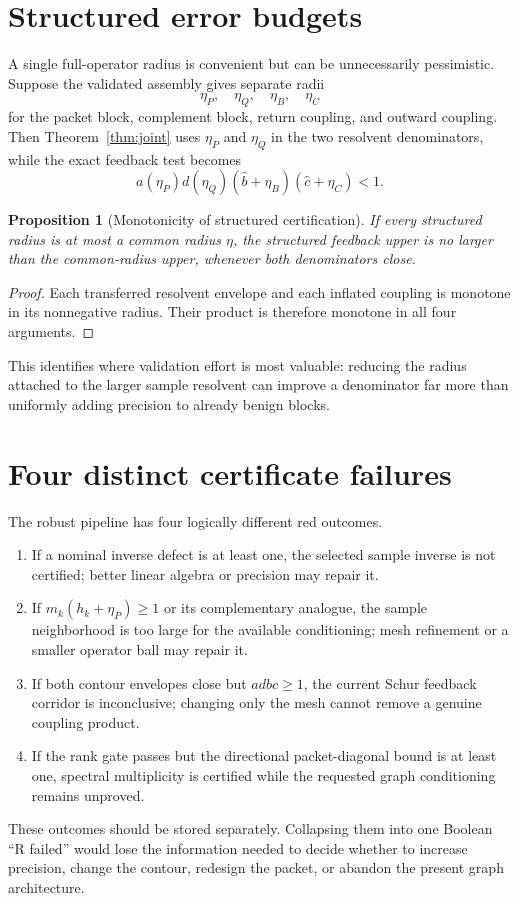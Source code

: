 \documentclass[12pt]{article}
\newtheorem{proposition}[theorem]{Proposition}
\begin{document}
\section{Structured error budgets}
A single full-operator radius is convenient but can be unnecessarily
pessimistic.  Suppose the validated assembly gives separate radii
\[
 \eta_P,\quad\eta_Q,\quad\eta_B,\quad\eta_C
\]
for the packet block, complement block, return coupling, and outward
coupling.  Then Theorem~\ref{thm:joint} uses $\eta_P$ and $\eta_Q$ in the two
resolvent denominators, while the exact feedback test becomes
\[
 a(\eta_P)d(\eta_Q)
 (\widehat b+\eta_B)(\widehat c+\eta_C)<1.
\]

\begin{proposition}[Monotonicity of structured certification]
If every structured radius is at most a common radius $\eta$, the structured
feedback upper is no larger than the common-radius upper, whenever both
denominators close.
\end{proposition}
\begin{proof}
Each transferred resolvent envelope and each inflated coupling is monotone
in its nonnegative radius.  Their product is therefore monotone in all four
arguments.
\end{proof}

This identifies where validation effort is most valuable: reducing the
radius attached to the larger sample resolvent can improve a denominator far
more than uniformly adding precision to already benign blocks.

\section{Four distinct certificate failures}
The robust pipeline has four logically different red outcomes.
\begin{enumerate}
\item If a nominal inverse defect is at least one, the selected sample inverse
is not certified; better linear algebra or precision may repair it.
\item If $m_k(h_k+\eta_P)\ge1$ or its complementary analogue, the sample
neighborhood is too large for the available conditioning; mesh refinement or
a smaller operator ball may repair it.
\item If both contour envelopes close but $adbc\ge1$, the current Schur
feedback corridor is inconclusive; changing only the mesh cannot remove a
genuine coupling product.
\item If the rank gate passes but the directional packet-diagonal bound is at
least one, spectral multiplicity is certified while the requested graph
conditioning remains unproved.
\end{enumerate}
These outcomes should be stored separately.  Collapsing them into one Boolean
``R failed'' would lose the information needed to decide whether to increase
precision, change the contour, redesign the packet, or abandon the present
graph architecture.
\end{document}
